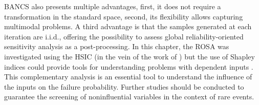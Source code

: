 BANCS also presents multiple advantages, first, it does not require a transformation in the standard space, second, its flexibility allows capturing multimodal problems. 
A third advantage is that the samples generated at each iteration are i.i.d., offering the possibility to assess global reliability-oriented sensitivity analysis as a post-processing. 
In this chapter, the ROSA was investigated using the HSIC (in the vein of the work of \citealp{marrel_chabridon_2021}) but the use of Shapley indices could provide tools for understanding problems with dependent inputs \citep{ilidrissi_2021_rosa}.
This complementary analysis is an essential tool to understand the influence of the inputs on the failure probability. 
Further studies should be conducted to guarantee the screening of noninfluential variables in the context of rare events. 


%    
